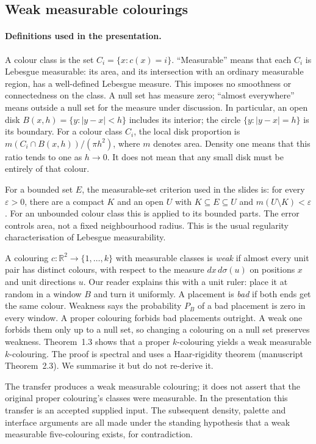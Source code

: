 \documentclass[11pt]{article}
\theoremstyle{definition}
\theoremstyle{remark}
\newcommand{\R}{\mathbb{R}}
\begin{document}
\subsection{Weak measurable colourings}
\paragraph{Definitions used in the presentation.}
A colour class is the set $C_i=\{x:c(x)=i\}$. ``Measurable'' means that each
$C_i$ is Lebesgue measurable: its area, and its intersection with an ordinary
measurable region, has a well-defined Lebesgue measure. This imposes no
smoothness or connectedness on the class. A null set has measure zero;
``almost everywhere'' means outside a null set for the measure under discussion.
In particular, an open disk $B(x,h)=\{y:|y-x|<h\}$ includes its interior;
the circle $\{y:|y-x|=h\}$ is its boundary. For a colour class $C_i$, the local
disk proportion is $m(C_i\cap B(x,h))/(\pi h^2)$, where $m$ denotes area.
Density one means that this ratio tends to one as $h\to0$. It does not mean
that any small disk must be entirely of that colour.

For a bounded set $E$, the measurable-set criterion used in the slides is:
for every $\varepsilon>0$, there are a compact $K$ and an open $U$ with
$K\subseteq E\subseteq U$ and $m(U\setminus K)<\varepsilon$. For an unbounded
colour class this is applied to its bounded parts. The error controls area,
not a fixed neighbourhood radius. This is the usual regularity
characterisation of Lebesgue measurability.

A colouring $c:\R^2\to\{1,\dots,k\}$ with measurable classes is \emph{weak} if almost every unit pair has distinct colours, with respect to the measure $dx\,d\sigma(u)$ on positions $x$ and unit directions $u$. Our reader explains this with a unit ruler: place it at random in a window $B$ and turn it uniformly. A placement is \emph{bad} if both ends get the same colour. Weakness says the probability $P_B$ of a bad placement is zero in every window. A proper colouring forbids bad placements outright. A weak one forbids them only up to a null set, so changing a colouring on a null set preserves weakness. Theorem~1.3 shows that a proper $k$-colouring yields a weak measurable $k$-colouring. The proof is spectral and uses a Haar-rigidity theorem (manuscript Theorem~2.3). We summarise it but do not re-derive it.

The transfer produces a weak measurable colouring; it does not assert that the
original proper colouring's classes were measurable. In the presentation this
transfer is an accepted supplied input. The subsequent density, palette and
interface arguments are all made under the standing hypothesis that a weak
measurable five-colouring exists, for contradiction.
\end{document}
